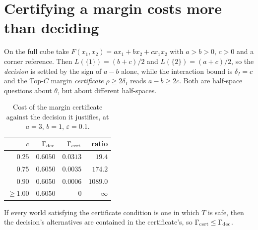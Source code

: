 
\section{Certifying a margin costs more than deciding}
\label{sec:margin}

On the full cube take $F(x_{1},x_{2})=ax_{1}+bx_{2}+cx_{1}x_{2}$ with $a>b>0$, $c>0$ and a
corner reference. Then $L(\{1\})=(b+c)/2$ and $L(\{2\})=(a+c)/2$, so the \emph{decision} is
settled by the sign of $a-b$ alone, while the interaction bound is $\delta_{I}=c$ and the
Top-$C$ margin \emph{certificate} $\rho\ge2\delta_{I}$ reads $a-b\ge2c$. Both are half-space
questions about $\theta$, but about different half-spaces.

\begin{table}[t]
\caption{Cost of the margin certificate against the decision it justifies, at $a=3$, $b=1$,
$\varepsilon=0.1$. \NUM{}}
\label{tab:margin}
\centering
\footnotesize
\begin{tabular}{@{}rrrr@{}}
\toprule
$c$ & $\Gamma_{\rm dec}$ & $\Gamma_{\rm cert}$ & ratio \\
\midrule
$0.25$ & $0.6050$ & $0.0313$ & $19.4$ \\
$0.75$ & $0.6050$ & $0.0035$ & $174.2$ \\
$0.90$ & $0.6050$ & $0.0006$ & $1089.0$ \\
$\ge1.00$ & $0.6050$ & $0$ & $\infty$ \\
\bottomrule
\end{tabular}
\end{table}

\begin{theorem}
\label{thm:cert}
If every world satisfying the certificate condition is one in which $T$ is safe, then the
decision's alternatives are contained in the certificate's, so
$\Gamma_{\rm cert}\le\Gamma_{\rm dec}$.
\end{theorem}


